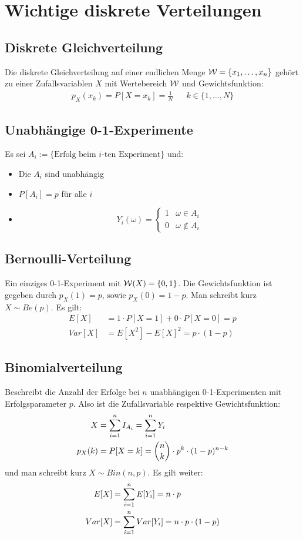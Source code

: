 {\section{Wichtige diskrete Verteilungen}}
\subsection*{Diskrete Gleichverteilung}
Die diskrete Gleichverteilung auf einer endlichen Menge $\mathcal{W} = \{ x_1, \dots,
  x_n \}$ gehört zu einer Zufallsvariablen $X$ mit Wertebereich $\mathcal{W}$ und
Gewichtsfunktion:
\begin{align*}
  p_X (x_k) = P[X = x_k] = \frac{1}{N} &  & k \in \{1, \dots, N\}
\end{align*}
\subsection*{Unabhängige 0-1-Experimente}
Es sei $A_i := \{\text{Erfolg beim $i$-ten Experiment}\}$ und:
\begin{itemize}
  \item Die $A_i$ sind unabhängig
  \item $P[A_i] = p$ für alle $i$
  \item \[
          Y_i (\omega) =
          \begin{cases}
            1 & \omega \in A_i      \\
            0 & \omega \not \in A_i
          \end{cases}
        \]
\end{itemize}
\subsection*{Bernoulli-Verteilung}
Ein einziges 0-1-Experiment mit $\mathcal{W} (X) = \{0, 1\}$. Die Gewichtsfunktion ist
gegeben durch $p_X (1) = p$, sowie $p_X (0) = 1-p$. Man schreibt kurz $X \sim
  Be (p)$. Es gilt:
\begin{align*}
  E[X]   & = 1 \cdot P[X = 1] + 0 \cdot P[X = 0] = p \\
  Var[X] & = E[X^2] - {E[X]}^2 = p \cdot  (1-p)
\end{align*}
\subsection*{Binomialverteilung}
Beschreibt die Anzahl der Erfolge bei $n$ unabhängigen 0-1-Experimenten mit
Erfolgsparameter $p$. Also ist die Zufallsvariable respektive Gewichtsfunktion:
\begin{align*}
  X       & = \sum_{i = 1}^n I_{A_i} = \sum_{i = 1}^n Y_i                                \\
  p_X (k) & = P[X = k] = \binom{n}{k} \cdot p^k \cdot  (1-p)^{n-k}
\end{align*}
und man schreibt kurz $X \sim Bin (n, p)$. Es gilt weiter:
\begin{align*}
  E[X]   & = \sum_{i = 1}^n E[Y_i] = n \cdot p                \\
  Var[X] & = \sum_{i = 1}^n Var[Y_i] = n \cdot p \cdot  (1-p)
\end{align*}
